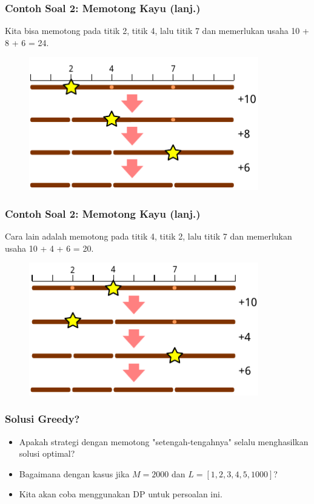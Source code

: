 \begin{frame}
\frametitle{Contoh Soal 2: Memotong Kayu (lanj.)}
Kita bisa memotong pada titik 2, titik 4, lalu titik 7 dan memerlukan usaha 10 + 8 + 6 = 24.
\begin{figure}
  \includegraphics[width=10cm]{asset/cutting-stick-2.pdf}
\end{figure}
\end{frame}

\begin{frame}
\frametitle{Contoh Soal 2: Memotong Kayu (lanj.)}
Cara lain adalah memotong pada titik 4, titik 2, lalu titik 7 dan memerlukan usaha 10 + 4 + 6 = 20.
\begin{figure}
  \includegraphics[width=10cm]{asset/cutting-stick-3.pdf}
\end{figure}
\end{frame}

\begin{frame}
\frametitle{Solusi Greedy?}
\begin{itemize}
  \item Apakah strategi \fgreedy dengan memotong "setengah-tengahnya" selalu menghasilkan solusi optimal?
  \item Bagaimana dengan kasus jika $M = 2000$ dan $L = [1, 2, 3, 4, 5, 1000]$?
  \item Kita akan coba menggunakan DP untuk persoalan ini.
\end{itemize}
\end{frame}

